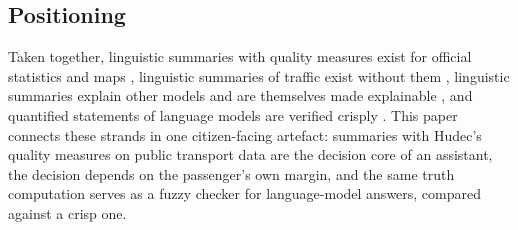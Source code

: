 \subsection{Positioning}
\label{sec:rw-position}
Taken together, linguistic summaries with quality measures exist for official statistics
and maps \citep{hudec2018,hudec2022}, linguistic summaries of traffic exist without them
\citep{pincay2021}, linguistic summaries explain other models \citep{plenary2022} and are
themselves made explainable \citep{wrede2023},
and quantified statements of language models are verified crisply \citep{eida2026}. This
paper connects these strands in one citizen-facing artefact: summaries with Hudec's quality
measures on public transport data are the decision core of an assistant, the decision depends
on the passenger's own margin, and the same truth computation serves as a fuzzy checker for
language-model answers, compared against a crisp one.
